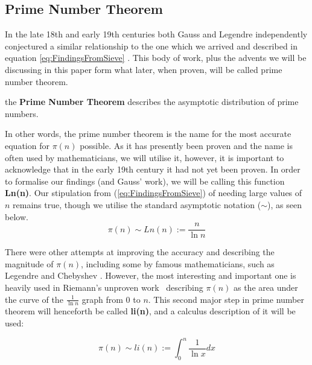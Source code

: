 \subsection{Prime Number Theorem} \label{Prime Number Theorem}
In the late 18th and early 19th centuries both Gauss and Legendre independently conjectured a similar relationship to the one which we arrived and described in equation \ref{eq:FindingsFromSieve} \citep[pp. 15-17]{Shanks1962NumTheory}. This body of work, plus the advents we will be discussing in this paper form what later, when proven, will be called prime number theorem.

\begin{Thm}
	the \textbf{Prime Number Theorem} describes the asymptotic distribution of prime numbers.
\end{Thm}

In other words, the prime number theorem is the name for the most accurate equation for $\pi(n)$ possible. As it has presently been proven and the name is often used by mathematicians, we will utilise it, however, it is important to acknowledge that in the early 19th century it had not yet been proven. In order to formalise our findings (and Gauss' work), we will be calling this function \textbf{Ln(n)}. Our stipulation from (\ref{eq:FindingsFromSieve}) of needing large values of $n$ remains true, though we utilise the standard asymptotic notation ($\sim$), as seen below.
\begin{equation}\label{eq:ln}
	\pi(n) \sim Ln(n) := \frac{n}{\ln n}
\end{equation}

There were other attempts at improving the accuracy and describing the magnitude of  $\pi(n)$, including some by famous mathematicians, such as Legendre and Chebyshev \citep[pp. 55,124-125]{derbyshire2003prime}. However, the most interesting and important one is heavily used in Riemann's unproven work \citep[p.116]{derbyshire2003prime} \textendash\ describing $\pi(n)$ as the area under the curve of the $\frac{1}{\ln n}$ graph from $0$ to $n$. This second major step in prime number theorem will henceforth be called \textbf{li(n)}, and a calculus description of it will be used\footnotemark:

\begin{equation} \label{eq:Li}
	 \pi(n) \sim li(n) := \int_{0}^{n} \frac{1}{\ln x}dx
\end{equation}


